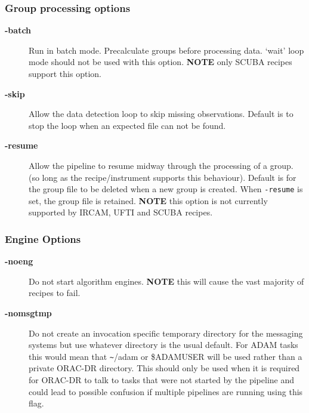 \documentclass[twoside,11pt]{article}
\renewcommand{\_}{\texttt{\symbol{95}}}
\begin{document}
\subsubsection*{Group processing options\label{oracdr_Group_processing_options}}
\begin{description}

\item[\textbf{-batch}] \mbox{}

Run in batch mode. Precalculate groups before processing
data. `wait' loop mode should not be used with this option.
\textbf{NOTE} only SCUBA recipes support this option.


\item[\textbf{-skip}] \mbox{}

Allow the data detection loop to skip missing observations.
Default is to stop the loop when an expected file can not be found.


\item[\textbf{-resume}] \mbox{}

Allow the pipeline to resume midway through the processing
of a group. (so long as the recipe/instrument supports
this behaviour). Default is for the group file to be deleted
when a new group is created. When \texttt{-resume} is set, the group
file is retained. \textbf{NOTE} this option is not currently supported by
IRCAM, UFTI and SCUBA recipes.

\end{description}
\subsubsection*{Engine Options\label{oracdr_Engine_Options}}
\begin{description}

\item[\textbf{-noeng}] \mbox{}

Do not start algorithm engines. \textbf{NOTE} this will cause
the vast majority of recipes to fail.


\item[\textbf{-nomsgtmp}] \mbox{}

Do not create an invocation specific temporary directory for the
messaging systems but use whatever directory is the usual default. For
ADAM tasks this would mean that \texttt{\~{}}/adam or \$ADAM\_USER will be used
rather than a private ORAC-DR directory. This should only be used when
it is required for ORAC-DR to talk to tasks that were not started by
the pipeline and could lead to possible confusion if multiple
pipelines are running using this flag.

\end{description}
\end{document}
